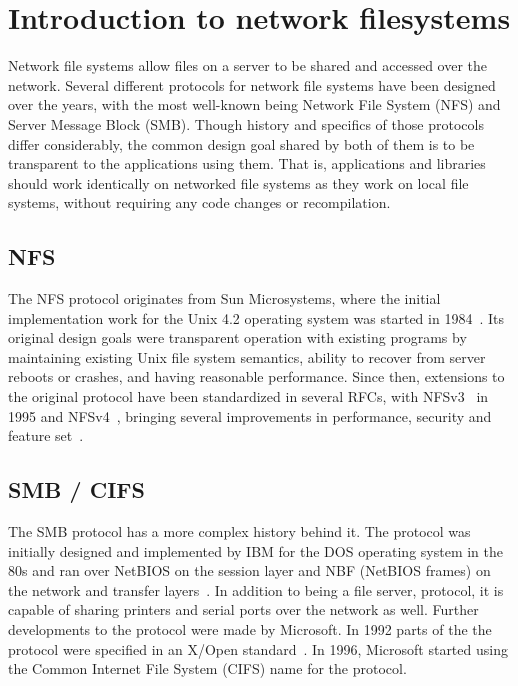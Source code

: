 \section{Introduction to network filesystems}

Network file systems allow files on a server to be shared and accessed over the network.
Several different protocols for network file systems have been designed over the years,
with the most well-known being Network File System (NFS) and 
Server Message Block (SMB).
Though history and specifics of those protocols differ considerably, the common design
goal shared by both of them is to be transparent to the applications using them.
That is, applications and libraries should work identically on networked file systems
as they work on local file systems, without requiring any code changes or recompilation.

\subsection{NFS}

The NFS protocol originates from Sun Microsystems, where the initial implementation work for the
Unix 4.2 operating system was started in 1984~\cite{NFS}. Its original design goals were
transparent operation with existing programs by maintaining existing Unix file system
semantics, ability to recover from server reboots or crashes, and having reasonable
performance. Since then, extensions to the original protocol have been standardized
in several RFCs, with NFSv3~\cite{NFSv3RFC} in 1995 and NFSv4~\cite{NFSv4RFC},
bringing several improvements in performance, security and feature set~\cite{NFSv4Better}.

\subsection{SMB / CIFS}

The SMB protocol has a more complex history behind it. The protocol was initially designed
and implemented by IBM for the DOS operating system in the 80s
and ran over NetBIOS on the session layer and NBF (NetBIOS frames) on the network and transfer layers~\cite{CifsBook}.
In addition to being a file server, protocol, it is capable of sharing printers and serial ports over the network as well.
Further developments to the protocol were made by Microsoft.
In 1992 parts of the the protocol were specified in an X/Open standard~\cite{XopenSmbSpec}.
In 1996, Microsoft started using the Common Internet File System (CIFS) name for the protocol.

